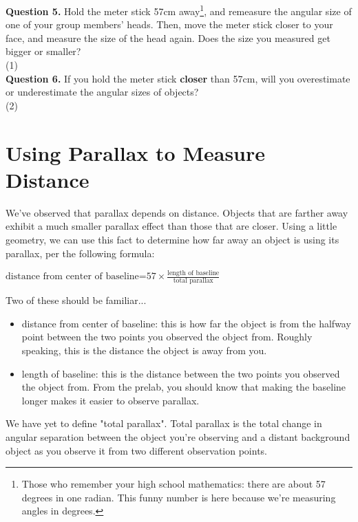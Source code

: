 \documentclass[11pt]{article}
\begin{document}
\textbf{Question 5.} Hold the meter stick 57cm away\footnote{Those who remember your high school mathematics: there are about 57 degrees in one radian. This funny number is here because we're measuring angles in degrees.}, and remeasure the angular size of one of your group members' heads. Then, move the meter stick closer to your face, and measure the size of the head again. Does the size you measured get bigger or smaller?\\ 

\vspace{1.5cm}
(1) \hrulefill\\

\textbf{Question 6.} If you hold the meter stick \textbf{closer} than 57cm, will you overestimate or underestimate the angular sizes of objects?\\

\vspace{1.5cm}
(2) \hrulefill

\newpage

\section{Using Parallax to Measure Distance}

We've observed that parallax depends on distance. Objects that are farther away exhibit a much smaller parallax effect than those that are closer. Using a little geometry, we can use this fact to determine how far away an object is using its parallax, per the following formula:

\begin{center}
	$\text{distance from center of baseline=}57\times\frac{\text{length of baseline}}{\text{total parallax}}$
\end{center}

Two of these should be familiar...
\begin{itemize}
	\item distance from center of baseline: this is how far the object is from the halfway point between the two points you observed the object from. Roughly speaking, this is the distance the object is away from you.
	\item length of baseline: this is the distance between the two points you observed the object from. From the prelab, you should know that making the baseline longer makes it easier to observe parallax.
\end{itemize}
We have yet to define "total parallax". Total parallax is the total change in angular separation between the object you're observing and a distant background object as you observe it from two different observation points.\\
\end{document}
